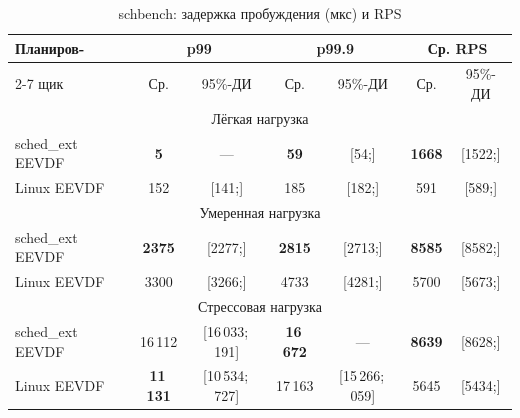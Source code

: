 \documentclass[12pt, oneside]{book}
\newenvironment{customquote}
{\list{}{\leftmargin=0.5cm
                \rightmargin=0.5cm
                \topsep=0pt
                \partopsep=0pt
                \parsep=2pt
                \itemsep=0pt
        }%
        \normalfont\relax
\item\relax}
{\endlist}
\begin{document}
\begin{customquote}
        \begin{table}[!ht]
                \centering\small
                \caption{schbench: задержка
                        пробуждения (мкс) и RPS}
                \label{tab:schbench}
                \vspace{0.3em}
                \begin{tabular}{|l|c|c|c|c|c|c|}
                        \hline
                        Планиров- & \multicolumn{2}{c|}{p99}
                                  & \multicolumn{2}{c|}{p99.9}
                                  & \multicolumn{2}{c|}{Ср. RPS} \\
                        \cline{2-7}
                        щик & Ср. & 95\%-ДИ & Ср. & 95\%-ДИ
                            & Ср. & 95\%-ДИ \\
                        \hline
                        \multicolumn{7}{|c|}{Лёгкая нагрузка} \\
                        \hline
                        sched\_ext EEVDF & \textbf{5} & ---
                                  & \textbf{59} & {\scriptsize [54;\:64]}
                                  & \textbf{1668} & {\scriptsize [1522;\:1814]} \\
                        Linux EEVDF & 152 & {\scriptsize [141;\:163]}
                                & 185 & {\scriptsize [182;\:189]}
                                & 591 & {\scriptsize [589;\:593]} \\
                        \hline
                        \multicolumn{7}{|c|}{Умеренная нагрузка} \\
                        \hline
                        sched\_ext EEVDF & \textbf{2375} & {\scriptsize [2277;\:2473]}
                                  & \textbf{2815} & {\scriptsize [2713;\:2917]}
                                  & \textbf{8585} & {\scriptsize [8582;\:8588]} \\
                        Linux EEVDF & 3300 & {\scriptsize [3266;\:3334]}
                                & 4733 & {\scriptsize [4281;\:5185]}
                                & 5700 & {\scriptsize [5673;\:5726]} \\
                        \hline
                        \multicolumn{7}{|c|}{Стрессовая нагрузка} \\
                        \hline
                        sched\_ext EEVDF & 16\,112 & {\scriptsize [16\,033;\:16\,191]}
                                  & \textbf{16\,672} & ---
                                  & \textbf{8639} & {\scriptsize [8628;\:8650]} \\
                        Linux EEVDF & \textbf{11\,131} & {\scriptsize [10\,534;\:11\,727]}
                                & 17\,163 & {\scriptsize [15\,266;\:19\,059]}
                                & 5645 & {\scriptsize [5434;\:5856]} \\
                        \hline
                \end{tabular}
        \end{table}


\end{customquote}
\end{document}
